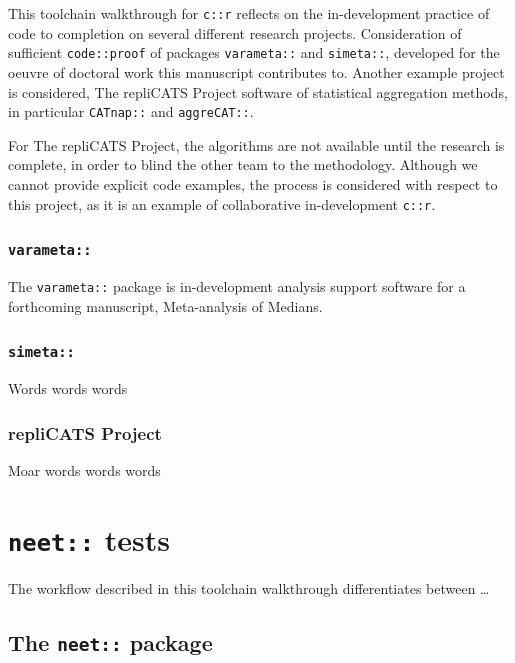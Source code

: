 \documentclass[
]{article}
\begin{document}
This toolchain walkthrough for \texttt{c::r} reflects on the in-development practice of code to completion on several different research projects. Consideration of sufficient \texttt{code::proof} of packages \texttt{varameta::} and \texttt{simeta::}, developed for the oeuvre of doctoral work this manuscript contributes to. Another example project is considered, The repliCATS Project software of statistical aggregation methods, in particular \texttt{CATnap::} and \texttt{aggreCAT::}.

For The repliCATS Project, the algorithms are not available until the research is complete, in order to blind the other team to the methodology. Although we cannot provide explicit code examples, the process is considered with respect to this project, as it is an example of collaborative in-development \texttt{c::r}.

\hypertarget{varameta}{%
\subsubsection{\texorpdfstring{\texttt{varameta::}}{varameta::}}\label{varameta}}

The \texttt{varameta::} package is in-development analysis support software for a forthcoming manuscript, Meta-analysis of Medians.

\hypertarget{simeta}{%
\subsubsection{\texorpdfstring{\texttt{simeta::}}{simeta::}}\label{simeta}}

Words words words

\hypertarget{replicats-project}{%
\subsubsection{repliCATS Project}\label{replicats-project}}

Moar words words words

\hypertarget{neet-tests}{%
\section{\texorpdfstring{\texttt{neet::} tests}{neet:: tests}}\label{neet-tests}}

The workflow described in this toolchain walkthrough differentiates between \ldots{}

\hypertarget{the-neet-package}{%
\subsection{\texorpdfstring{The \texttt{neet::} package}{The neet:: package}}\label{the-neet-package}}
\end{document}
